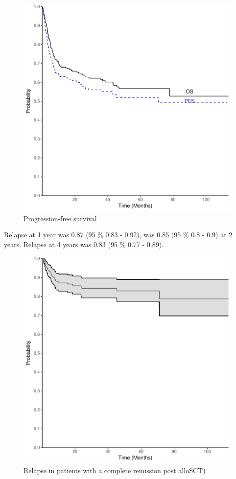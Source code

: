 \documentclass[a4paper,11pt] {article}
\begin{document}
\begin{figure}[h]
\begin{center}
\includegraphics{Rapport-fig3}
\end{center}
\caption{Progression-free survival}
\label{fig3}
\end{figure}

\pagebreak
Relapse at 1 year was 0.87 (95 \% 0.83 - 0.92), was 0.85 (95 \% 0.8 - 0.9) at 2 years. Relapse at 4 years was 0.83 (95 \% 0.77 - 0.89).
\begin{figure}[h]
\begin{center}
\includegraphics{Rapport-fig4}
\end{center}
\caption{Relapse in patients with a complete remission post alloSCT)}
\label{fig4}
\end{figure}
\end{document}
